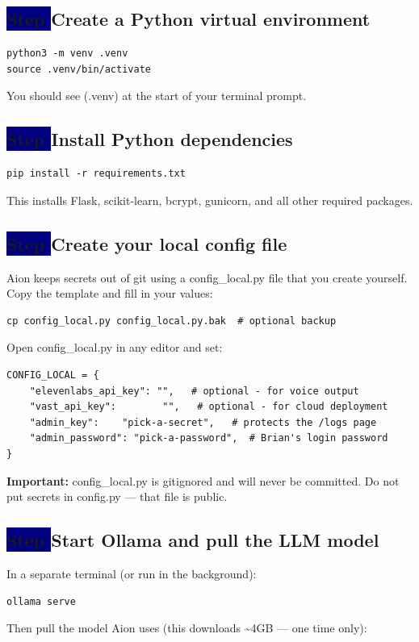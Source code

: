 \documentclass[11pt,a4paper]{article}
\newcommand{\code}[1]{{\ttfamily\small\color{navy}#1}}
\newcounter{step}
\newcommand{\step}[1]{%
  \stepcounter{step}%
  \subsection*{\colorbox{navy}{\color{white}\;\textbf{Step \thestep}\;}\quad #1}%
}
\begin{document}
\step{Create a Python virtual environment}

\begin{lstlisting}
python3 -m venv .venv
source .venv/bin/activate
\end{lstlisting}

You should see \code{(.venv)} at the start of your terminal prompt.

\step{Install Python dependencies}

\begin{lstlisting}
pip install -r requirements.txt
\end{lstlisting}

This installs Flask, scikit-learn, bcrypt, gunicorn, and all other required packages.

\step{Create your local config file}

Aion keeps secrets out of git using a \code{config\_local.py} file that you create yourself.
Copy the template and fill in your values:

\begin{lstlisting}
cp config_local.py config_local.py.bak  # optional backup
\end{lstlisting}

Open \code{config\_local.py} in any editor and set:

\begin{lstlisting}
CONFIG_LOCAL = {
    "elevenlabs_api_key": "",   # optional - for voice output
    "vast_api_key":        "",   # optional - for cloud deployment
    "admin_key":    "pick-a-secret",   # protects the /logs page
    "admin_password": "pick-a-password",  # Brian's login password
}
\end{lstlisting}

\begin{warnbox}
  \textbf{Important:} \code{config\_local.py} is gitignored and will never be committed.
  Do not put secrets in \code{config.py} — that file is public.
\end{warnbox}

\step{Start Ollama and pull the LLM model}

In a separate terminal (or run in the background):

\begin{lstlisting}
ollama serve
\end{lstlisting}

Then pull the model Aion uses (this downloads \textasciitilde4GB — one time only):
\end{document}
